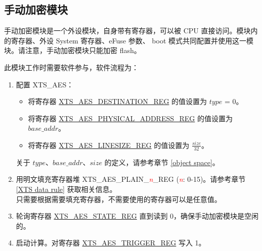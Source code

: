 \documentclass[main\_\_CN.tex]{subfiles}
\begin{document}
\subsection{手动加密模块}

手动加密模块是一个外设模块，自身带有寄存器，可以被 CPU 直接访问。模块内的寄存器、外设 System 寄存器、eFuse 参数、 boot 模式共同配置并使用这一模块。请注意，手动加密模块只能加密 flash。

此模块工作时需要软件参与，软件流程为：

\begin{enumerate}

    \item \label{first step in xts}
        配置 XTS\_AES：
    \begin{itemize}
        \item 将寄存器 \hyperref[regdesc:XTSAESDESTINATIONREG]{XTS\_AES\_DESTINATION\_REG} 的值设置为 \begin{math}type\end{math} = 0。
        \item 将寄存器 \hyperref[regdesc:XTSAESPHYSICALADDRESSREG]{XTS\_AES\_PHYSICAL\_ADDRESS\_REG} 的值设置为 \begin{math}base\_addr\end{math}。
        \item 将寄存器 \hyperref[regdesc:XTSAESLINESIZEREG]{XTS\_AES\_LINESIZE\_REG} 的值设置为 \begin{math}\frac{size}{32}\end{math}。
    \end{itemize}
    关于 \begin{math} type \end{math}、\begin{math} base\_addr\end{math}、\begin{math}size\end{math} 的定义，请参考章节 \ref{object space}。
    \item 用明文填充寄存器堆 XTS\_AES\_PLAIN\_\textcolor{red}{\it{n}}\_REG (\textcolor{red}{\it{n}}: 0-15)。请参考章节 \ref{XTS data rule} 获取相关信息。\\只需要根据需要填充寄存器，不需要使用的寄存器可以是任意值。

    \item 轮询寄存器 \hyperref[regdesc:XTSAESSTATEREG]{XTS\_AES\_STATE\_REG} 直到读到 0，确保手动加密模块是空闲的。

    \item 启动计算。对寄存器 \hyperref[regdesc:XTSAESTRIGGERREG]{XTS\_AES\_TRIGGER\_REG} 写入 1。


\end{enumerate}
\end{document}
